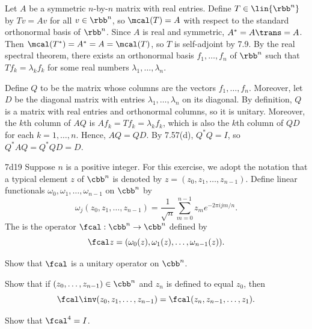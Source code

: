 \begin{sol}
    Let $A$ be a symmetric $n$-by-$n$ matrix with real entries.
    Define $T \in \lin{\rbb^n}$ by $Tv = Av$ for all $v \in \rbb^n$, so $\mcal(T) = A$ with respect to the standard orthonormal basis of $\rbb^n$.
    Since $A$ is real and symmetric, $A^\ast = A\trans = A$.
    Then $\mcal(T^\ast) = A^\ast = A = \mcal(T)$, so $T$ is self-adjoint by 7.9.
    By the real spectral theorem, there exists an orthonormal basis $f_1, \ldots, f_n$ of $\rbb^n$ such that $T f_k = \lambda_k f_k$ for some real numbers $\lambda_1, \ldots, \lambda_n$.

    Define $Q$ to be the matrix whose columns are the vectors $f_1, \ldots, f_n$.
    Moreover, let $D$ be the diagonal matrix with entries $\lambda_1, \ldots, \lambda_n$ on its diagonal.
    By definition, $Q$ is a matrix with real entries and orthonormal columns, so it is unitary.
    Moreover, the $k$th column of $AQ$ is $Af_k = Tf_k = \lambda_k f_k$, which is also the $k$th column of $QD$ for each $k = 1, \ldots, n$.
    Hence, $AQ = QD$.
    By 7.57(d), $Q^\ast Q = I$, so $Q^\ast AQ = Q^\ast QD = D$.
\end{sol}

\begin{exercise}{7d19}
    Suppose $n$ is a positive integer.
    For this exercise, we adopt the notation that a typical element $z$ of $\cbb^n$ is denoted by $z = (z_0, z_1, \ldots, z_{n-1})$.
    Define linear functionals $\omega_0, \omega_1, \ldots, \omega_{n-1}$ on $\cbb^n$ by
    \[
        \omega_j(z_0, z_1, \ldots, z_{n-1}) = \frac{1}{\sqrt{n}} \sum_{m=0}^{n-1} z_m e^{-2\pi i jm/n}.
    \]
    The  is the operator $\fcal : \cbb^n \to \cbb^n$ defined by
    \[
        \fcal z = (\omega_0(z), \omega_1(z), \ldots, \omega_{n-1}(z)).
    \]
    \begin{subexercises}
        \item Show that $\fcal$ is a unitary operator on $\cbb^n$.
        \item Show that if $(z_0, \ldots, z_{n-1}) \in \cbb^n$ and $z_n$ is defined to equal $z_0$, then
        \[
            \fcal\inv(z_0, z_1, \ldots, z_{n-1}) = \fcal(z_n, z_{n-1}, \ldots, z_1).
        \]
        \item Show that $\fcal^4 = I$.
    \end{subexercises}

\end{exercise}

